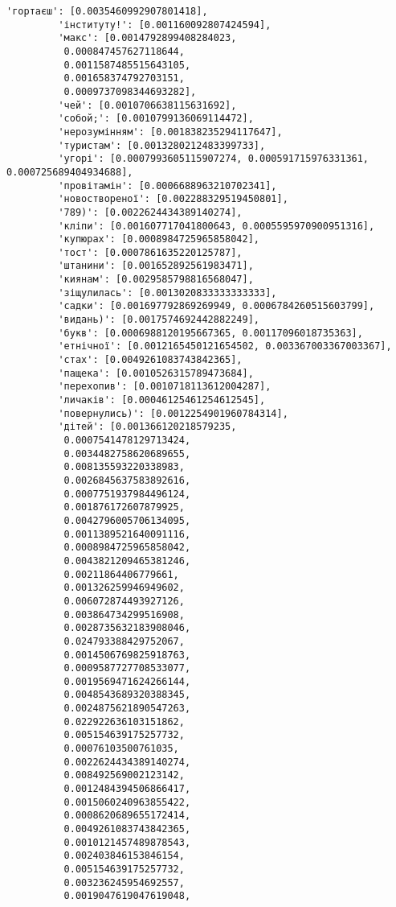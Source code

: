 \documentclass[11pt]{article}
\begin{document}
\begin{Verbatim}[commandchars=\\\{\}]
         'гортаєш': [0.0035460992907801418],
         'інституту!': [0.001160092807424594],
         'макс': [0.0014792899408284023,
          0.000847457627118644,
          0.0011587485515643105,
          0.001658374792703151,
          0.0009737098344693282],
         'чей': [0.0010706638115631692],
         'собой;': [0.0010799136069114472],
         'нерозумінням': [0.001838235294117647],
         'туристам': [0.0013280212483399733],
         'угорі': [0.0007993605115907274, 0.000591715976331361, 0.000725689404934688],
         'провітамін': [0.0006688963210702341],
         'новоствореної': [0.002288329519450801],
         '789)': [0.0022624434389140274],
         'кліпи': [0.001607717041800643, 0.0005595970900951316],
         'купюрах': [0.0008984725965858042],
         'тост': [0.0007861635220125787],
         'штанини': [0.001652892561983471],
         'киянам': [0.0029585798816568047],
         'зіщулилась': [0.0013020833333333333],
         'садки': [0.001697792869269949, 0.0006784260515603799],
         'видань)': [0.0017574692442882249],
         'букв': [0.0006988120195667365, 0.00117096018735363],
         'етнічної': [0.0012165450121654502, 0.003367003367003367],
         'стах': [0.0049261083743842365],
         'пащека': [0.0010526315789473684],
         'перехопив': [0.0010718113612004287],
         'личаків': [0.00046125461254612545],
         'повернулись)': [0.0012254901960784314],
         'дітей': [0.001366120218579235,
          0.0007541478129713424,
          0.0034482758620689655,
          0.008135593220338983,
          0.0026845637583892616,
          0.0007751937984496124,
          0.001876172607879925,
          0.0042796005706134095,
          0.0011389521640091116,
          0.0008984725965858042,
          0.0043821209465381246,
          0.00211864406779661,
          0.001326259946949602,
          0.006072874493927126,
          0.003864734299516908,
          0.0028735632183908046,
          0.024793388429752067,
          0.0014506769825918763,
          0.0009587727708533077,
          0.0019569471624266144,
          0.0048543689320388345,
          0.0024875621890547263,
          0.022922636103151862,
          0.005154639175257732,
          0.00076103500761035,
          0.0022624434389140274,
          0.008492569002123142,
          0.0012484394506866417,
          0.0015060240963855422,
          0.0008620689655172414,
          0.0049261083743842365,
          0.0010121457489878543,
          0.002403846153846154,
          0.005154639175257732,
          0.003236245954692557,
          0.0019047619047619048,

\end{Verbatim}
\end{document}
